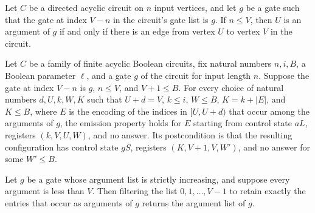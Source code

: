 \begin{lemma}
\label{BoolCircuit.AdjWalk.edge_iff}
\leanok
{}
Let $C$ be a directed acyclic circuit on $n$ input vertices, and let $g$ be a gate such
that the gate at index $V-n$ in the circuit's gate list is $g$. If $n\le V$, then $U$ is
an argument of $g$ if and only if there is an edge from vertex $U$ to vertex $V$ in the
circuit.
\end{lemma}

\begin{lemma}
\label{BoolCircuit.AdjWalk.aLoop}
\leanok
{}
Let $C$ be a family of finite acyclic Boolean circuits, fix natural numbers $n,i,B$, a
Boolean parameter $\ell$, and a gate $g$ of the circuit for input length $n$. Suppose
the gate at index $V-n$ is $g$, $n\le V$, and $V+1\le B$. For every choice of natural
numbers $d,U,k,W,K$ such that $U+d=V$, $k\le i$, $W\le B$, $K=k+|E|$, and $K\le B$,
where $E$ is the encoding of the indices in $[U,U+d)$ that occur among the arguments of
$g$, the emission property holds for $E$ starting from control state $aL$, registers
$(k,V,U,W)$, and no answer. Its postcondition is that the resulting configuration has
control state $gS$, registers $(K,V+1,V,W')$, and no answer for some $W'\le B$.
\end{lemma}

\begin{lemma}
\label{BoolCircuit.AdjWalk.args_eq_filter}
\leanok
{}
Let $g$ be a gate whose argument list is strictly increasing, and suppose every argument
is less than $V$. Then filtering the list $0,1,\ldots,V-1$ to retain exactly the entries
that occur as arguments of $g$ returns the argument list of $g$.
\end{lemma}

